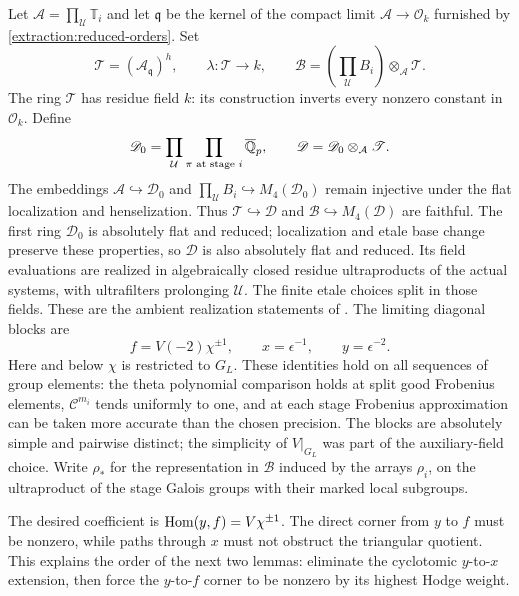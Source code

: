 Let $\mathcal A=\prod_{\mathcal U}\mathbb T_i$ and let
$\mathfrak q$ be the kernel of the compact limit
$\mathcal A\to\mathcal O_k$ furnished by
\eqref{extraction:reduced-orders}.  Set
\[
 \mathscr T=(\mathcal A_{\mathfrak q})^h,
 \qquad \lambda:\mathscr T\longrightarrow k,
 \qquad \mathscr B=(\prod_{\mathcal U}B_i)\otimes_{\mathcal A}\mathscr T.
\]
The ring $\mathscr T$ has residue field $k$: its construction
inverts every nonzero constant in $\mathcal O_k$.  Define
\[
 \mathscr D_0=\prod_{\mathcal U}\prod_{\pi\text{ at stage }i}
                         \overline{\mathbb Q}_p,
 \qquad
 \mathscr D=\mathscr D_0\otimes_{\mathcal A}\mathscr T.
\]
The embeddings $\mathcal A\hookrightarrow\mathscr D_0$ and
$\prod_{\mathcal U}B_i\hookrightarrow M_4(\mathscr D_0)$
remain injective under the flat localization and henselization.
Thus $\mathscr T\hookrightarrow\mathscr D$ and
$\mathscr B\hookrightarrow M_4(\mathscr D)$ are faithful.
The first ring $\mathscr D_0$ is absolutely flat and reduced;
localization and etale base change preserve these properties,
so $\mathscr D$ is also absolutely flat and reduced.  Its
field evaluations are realized in algebraically closed residue
ultraproducts of the actual systems, with ultrafilters prolonging
$\mathcal U$.  The finite etale choices split in those fields.
These are the ambient realization statements of
\cite[Section~9.1]{C}.
The limiting diagonal blocks are
\begin{equation}
 f=V(-2)\chi^{\pm1},\qquad
 x=\epsilon^{-1},\qquad y=\epsilon^{-2}.
\label{extraction:blocks}
\end{equation}
Here and below $\chi$ is restricted to $G_L$.  These identities
hold on all sequences of group elements: the theta polynomial
comparison holds at split good Frobenius elements,
$\mathcal C^{m_i}$ tends uniformly to one, and at each stage
Frobenius approximation can be taken more accurate than the
chosen precision.  The blocks are absolutely simple and
pairwise distinct; the simplicity of $V|_{G_L}$ was part of
the auxiliary-field choice.
Write $\rho_*$ for the representation in $\mathscr B$ induced
by the arrays $\rho_i$, on the ultraproduct of the stage Galois
groups with their marked local subgroups.

The desired coefficient is $\operatorname{Hom}(y,f)=V\chi^{\pm1}$.
The direct corner from $y$ to $f$ must be nonzero, while paths
through $x$ must not obstruct the triangular quotient.  This
explains the order of the next two lemmas: eliminate the
cyclotomic $y$-to-$x$ extension, then force the $y$-to-$f$
corner to be nonzero by its highest Hodge weight.

